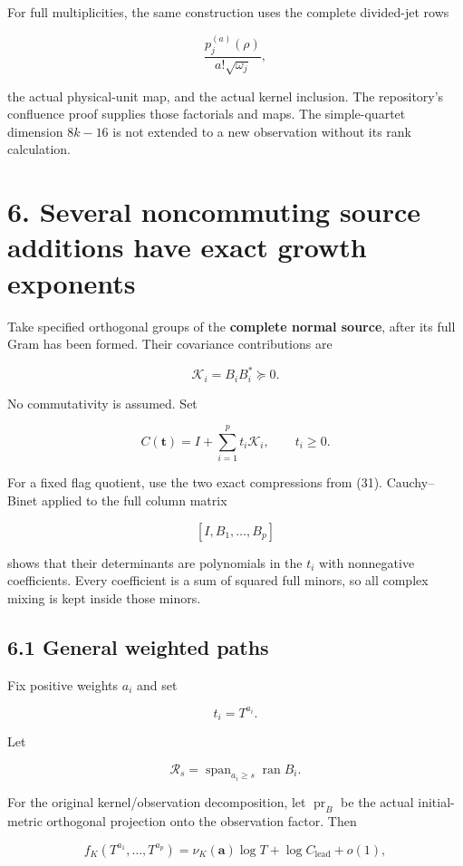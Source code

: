 For full multiplicities, the same construction uses the complete divided-jet rows

\[
\frac{p_j^{(a)}(\rho)}{a!\sqrt{\omega_j}},
\]

the actual physical-unit map, and the actual kernel inclusion. The repository's confluence proof supplies those factorials and maps. The simple-quartet dimension \(8k-16\) is not extended to a new observation without its rank calculation.

\section{6. Several noncommuting source additions have exact growth exponents}\label{several-noncommuting-source-additions-have-exact-growth-exponents}

Take specified orthogonal groups of the \textbf{complete normal source}, after its full Gram has been formed. Their covariance contributions are

\[
\mathcal K_i=B_iB_i^*\succeq0.
\]

No commutativity is assumed. Set

\[
C(\mathbf t)=I+\sum_{i=1}^p t_i\mathcal K_i,
\qquad t_i\ge0.
\]

For a fixed flag quotient, use the two exact compressions from (31). Cauchy--Binet applied to the full column matrix

\[
[I,B_1,\ldots,B_p]
\]

shows that their determinants are polynomials in the \(t_i\) with nonnegative coefficients. Every coefficient is a sum of squared full minors, so all complex mixing is kept inside those minors.

\subsection{6.1 General weighted paths}\label{general-weighted-paths}

Fix positive weights \(a_i\) and set

\[
t_i=T^{a_i}.
\]

Let

\[
\mathscr R_s
=
\operatorname{span}_{a_i\ge s}\operatorname{ran}B_i.
\]

For the original kernel/observation decomposition, let \(\operatorname{pr}_B\) be the actual initial-metric orthogonal projection onto the observation factor. Then

\[
\boxed{
f_K(T^{a_1},\ldots,T^{a_p})
=
\nu_K(\mathbf a)\log T+\log C_{\mathrm{lead}}+o(1),
}
\tag{39}
\]

